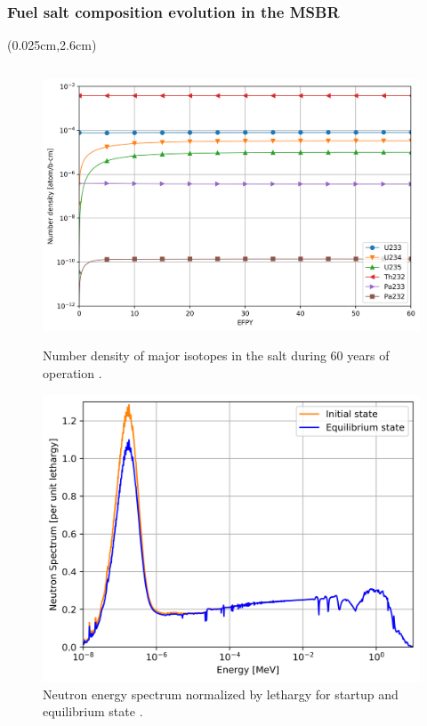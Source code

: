 \begin{frame}
\frametitle{Fuel salt composition evolution in the MSBR}
\begin{textblock*}{12.8cm}(0.025cm,2.6cm) %
\begin{columns}
	\column[t]{6.5cm}
	\vspace{-0.35in}
	\begin{figure}[t]
	\begin{overprint}
		\includegraphics[height=0.65\textheight]{../dissertation/figures/ch3/major_isotopes_adens.png}
		\vspace{-0.15in}
		\caption{Number density of major isotopes in the salt
			during 60 years of operation \cite{rykhlevskii_advanced_2018}.}
		\includegraphics[height=0.65\textheight]{../dissertation/figures/ch3/spectrum.png}
		\vspace{-0.15in}
		\caption{Neutron energy spectrum normalized by lethargy for startup 
		and equilibrium state \cite{rykhlevskii_advanced_2018}.}
		

\end{overprint}
\end{figure}
\end{columns}
\end{textblock*}
\end{frame}
